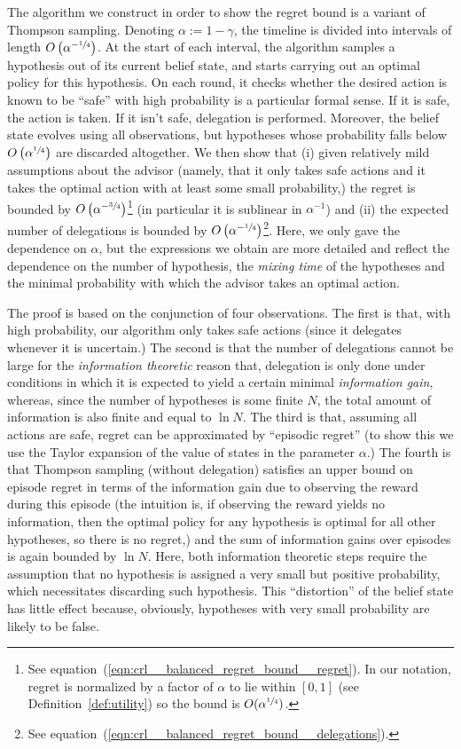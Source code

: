 \documentclass[anon,12pt]{colt2018} %
\newcommand{\AP}[1]{\left(#1\right)}
\begin{document}
The algorithm we construct in order to show the regret bound is a variant of Thompson sampling. Denoting $\alpha:=1-\gamma$, the timeline is divided into intervals of length $O\AP{\alpha^{-\sfrac{1}{4}}}$. At the start of each interval, the algorithm samples a hypothesis out of its current belief state, and starts carrying out an optimal policy for this hypothesis. On each round, it checks whether the desired action is known to be \enquote{safe} with high probability is a particular formal sense. If it is safe, the action is taken. If it isn't safe, delegation is performed. Moreover, the belief state evolves using all observations, but hypotheses whose probability falls below $O\AP{\alpha^{\sfrac{1}{4}}}$ are discarded altogether. We then show that (i) given relatively mild assumptions about the advisor (namely, that it only takes safe actions and it takes the optimal action with at least some small probability,) the regret is bounded by $O\AP{\alpha^{-\sfrac{3}{4}}}$\footnote{See equation~(\ref{eqn:crl__balanced_regret_bound__regret}). In our notation, regret is normalized by a factor of $\alpha$ to lie within $[0,1]$ (see Definition~\ref{def:utility}) so the bound is $O(\alpha^{\sfrac{1}{4}})$.} (in particular it is sublinear in $\alpha^{-1}$) and (ii) the expected number of delegations is bounded by $O\AP{\alpha^{-\sfrac{1}{4}}}$\footnote{See equation~(\ref{eqn:crl__balanced_regret_bound__delegations}).}. Here, we only gave the dependence on $\alpha$, but the expressions we obtain are more detailed and reflect the dependence on the number of hypothesis, the \emph{mixing time} of the hypotheses and the minimal probability with which the advisor takes an optimal action.

The proof is based on the conjunction of four observations. The first is that, with high probability, our algorithm only takes safe actions (since it delegates whenever it is uncertain.) The second is that the number of delegations cannot be large for the \emph{information theoretic} reason that, delegation is only done under conditions in which it is expected to yield a certain minimal \emph{information gain}, whereas, since the number of hypotheses is some finite $N$, the total amount of information is also finite and equal to $\ln N$. The third is that, assuming all actions are safe, regret can be approximated by \enquote{episodic regret} (to show this we use the Taylor expansion of the value of states in the parameter $\alpha$.) The fourth is that Thompson sampling (without delegation) satisfies an upper bound on episode regret in terms of the information gain due to observing the reward during this episode (the intuition is, if observing the reward yields no information, then the optimal policy for any hypothesis is optimal for all other hypotheses, so there is no regret,) and the sum of information gains over episodes is again bounded by $\ln N$. Here, both information theoretic steps require the assumption that no hypothesis is assigned a very small but positive probability, which necessitates discarding such hypothesis. This \enquote{distortion} of the belief state has little effect because, obviously, hypotheses with very small probability are likely to be false.
\end{document}
